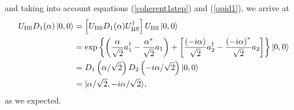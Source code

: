 and taking into account equations (\ref{coherent1step}) and (\ref{opid1}), we arrive at
\begin{align}
U_{\mathrm{BS}} D_1(\alpha)\ket{0, 0} &= \left[U_{\mathrm{BS}} D_1(\alpha) U_{\mathrm{BS}}^\dagger\right] U_{\mathrm{BS}}\ket{0, 0}
\nonumber \\
&= \mathrm{exp}\left\lbrace\left(\frac{\alpha}{\sqrt{2}} a_1^\dagger - \frac{\alpha^{*}}{\sqrt{2}}a_1\right) + \left[\frac{\left(-i\alpha\right)}{\sqrt{2}} a_2^\dagger - \frac{\left(-i\alpha\right)^{*}}{\sqrt{2}}a_2 \right]  \right\rbrace \ket{0, 0}
\nonumber \\
&= D_1\left(\alpha/\sqrt{2}\right)D_2\left(-i\alpha/\sqrt{2}\right) \ket{0, 0}
\nonumber \\
&= |\alpha/\sqrt{2},-i\alpha/\sqrt{2}\rangle,
\end{align}
as we expected.

